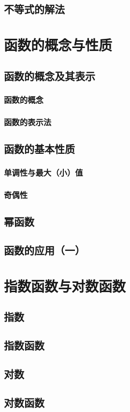 \documentclass[no-math,10pt]{ctexbook}
\begin{document}
\section{不等式的解法}
\chapter{函数的概念与性质}
\section{函数的概念及其表示}
\subsection{函数的概念}
\subsection{函数的表示法}
\section{函数的基本性质}
\subsection{单调性与最大（小）值}
\subsection{奇偶性}
\section{幂函数}
\section{函数的应用（一）}
\chapter{指数函数与对数函数}
\section{指数}
\section{指数函数}
\section{对数}
\section{对数函数}
\end{document}
